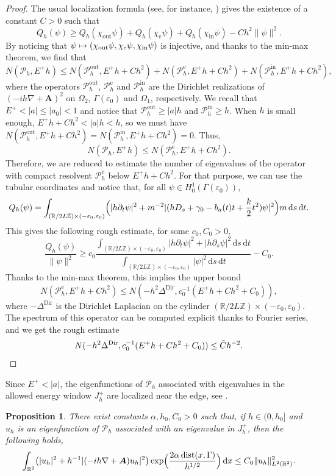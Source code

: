 \documentclass[JEP,XML,SOM,Unicode,NoFloatCountersInSection,published]{cedram}
\newcommand\mto{\mathchoice{\longmapsto}{\mapsto}{\mapsto}{\mapsto}}
\let\epsilon\varepsilon
\newcommand{\rd}{\,\mathrm{d}}
\newcommand{\Dir}{\mathrm{Dir}}
\newcommand{\rme}{\mathrm{e}}
\newcommand{\rin}{\mathrm{in}}
\newcommand{\out}{\mathrm{out}}
\DeclareMathOperator{\dist}{dist}
\newcommand{\cP}{\mathcal{P}}
\theoremstyle{plain}
\newtheorem{proposition}[theorem]{Proposition}
\theoremstyle{definition}
\newcommand{\A}{\boldsymbol{A}}
\newcommand{\R}{\mathbb{R}}
\begin{document}
\begin{proof}
The usual localization formula (see, for instance, \cite[\S 4.1.1]{Ray}) gives the existence of a constant $C>0$ such that
\[
Q_h(\psi)\geq Q_h(\chi_{\out}\psi)+Q_h(\chi_{\rme}\psi)+Q_h(\chi_{\rin}\psi)-Ch^2\|\psi\|^2.
\]
By noticing that $\psi\mto(\chi_{\out}\psi,\chi_{\rme}\psi,\chi_{\rin}\psi)$ is injective, and thanks to the min-max theorem, we find that
\[
N(\cP_h, E^+h)\leq N(\cP^{\out}_h,E^+h+Ch^2)+N(\cP_h^{\rme},E^+h+Ch^2)+N(\cP_h^{\rin},E^+h+Ch^2),
\]
where the operators $\cP^{\out}_h$, $\cP^{\rme}_h$ and $\cP^{\rin}_h$ are the Dirichlet realizations of $(-ih\nabla+\A)^2$ on $\Omega_2$, $\Gamma(\epsilon_0)$ and $\Omega_1$, respectively.
We recall that $E^+<|a|\leq |a_0|<1$ and notice that $\cP^{\out}_h\geq |a|h$ and $\cP^{\rin}_h\geq h$. When $h$ is small enough, $E^+h+Ch^2<|a|h<h$, so we must have $N(\cP^{\out}_h,E^+h+Ch^2)=N(\cP^{\rin}_h,E^+h+Ch^2)=0$. Thus,
\[
N(\cP_h, E^+h)\leq N(\cP_h^{\rme},E^+h+Ch^2).
\]
Therefore, we are reduced to estimate the number of eigenvalues of the operator with compact resolvent $\cP_h^{\rme}$ below $E^+h+Ch^2$. For that purpose, we can use the tubular coordinates and notice that, for all $\psi\in H^1_0(\Gamma(\epsilon_0))$,
\[
Q_h(\psi)=\int_{(\mathbb R/ 2L \mathbb Z)\times(-\epsilon_0,\epsilon_0)}\Bigl(|h\partial_t\psi|^2+m^{-2}|(hD_s+\gamma_0-b_a(t)t+\frac{k}{2}t^2)\psi|^2\Bigr)m\rd s\rd t.
\]
This gives the following rough estimate, for some $c_0,C_0>0$,
\[
\frac{Q_h(\psi)}{\|\psi\|^2}\geq c_0\frac{\int_{(\mathbb R/ 2L \mathbb Z)\times(-\epsilon_0,\epsilon_0)} |h\partial_t\psi|^2+|h\partial_s\psi|^2\rd s\rd t}{\int_{(\mathbb R/ 2L \mathbb Z)\times(-\epsilon_0,\epsilon_0)} |\psi|^2\rd s\rd t}-C_0.
\]
Thanks to the min-max theorem, this implies the upper bound
\[
N(\cP_h^{\rme},E^+h+Ch^2)\leq N(-h^2\Delta^{\Dir},c_0^{-1}(E^+h+Ch^2+C_0)),
\]
where $-\Delta^{\Dir}$ is the Dirichlet Laplacian on the cylinder $(\mathbb R/ 2L \mathbb Z)\times(-\epsilon_0,\epsilon_0)$. The spectrum of this operator can be computed explicit thanks to Fourier series, and we get the rough estimate
\[
N(-h^2\Delta^{\Dir},c_0^{-1}(E^+h+Ch^2+C_0))\leq\tilde Ch^{-2}.\qedhere
\]
\end{proof}

Since $E^+<|a|$, the eigenfunctions of $\cP_h$ associated with eigenvalues in the allowed energy window $J^+_h$ are localized near the edge, see \cite{AK20}.

\begin{proposition}\label{prop:dec}
There exist constants $\alpha,h_0,C_0>0$ such that, if $h\in (0,h_0]$ and~$u_h$ is an eigenfunction of $\cP_h$ associated with an eigenvalue in $J^+_h$, then the following holds,
\begin{equation}\label{eq:dec-norm}
\int_{\mathbb R^2}\bigl(|u_{h}|^2+h^{-1}|(-ih\nabla+\A)u_{h}|^2 \bigr)\exp\Bigl(\frac{2\alpha\dist(x,\Gamma)}{h^{1/2}} \Bigr)\rd x\leq C_0\|u_h\|^2_{L^2(\R^2)}.
\end{equation}
\end{proposition}
\end{document}
